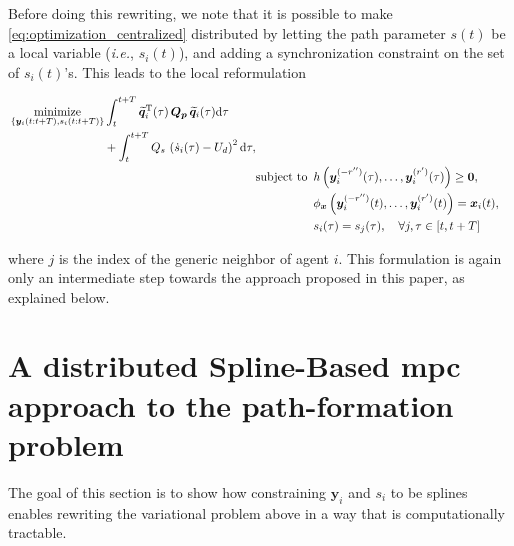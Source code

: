 Before doing this rewriting, we note that it is possible to make \eqref{eq:optimization_centralized} distributed by letting the path parameter $s(t)$ be a local variable (\emph{i.e.}, $s_i(t)$), and adding a synchronization constraint on the set of $s_i(t)$'s. This leads to the local reformulation

\begin{subequations}
    \begin{align}
        \begin{split}
            &\opt_{ \left\lbrace \bm{y}_i(t:t+T), s_i(t:t+T) \right\rbrace }
            \int_{t}^{t+T}
                \widetilde{\bm{q}}_i\T(\tau)
                \, \bm{Q}_{\bm{p}} \, 
                \widetilde{\bm{q}}_i(\tau)
                {\rm d}\tau \\
            & \qquad \qquad \qquad \qquad
            + \int_{t}^{t+T} Q_s \,\left(\dot{s}_i(\tau) - U_d\right)^2 {\rm d}\tau , 
        \end{split} \label{eq:criterion}\\
        & \text{subject to } \, h\left(\bm{y}_i^{(-r'')}(\tau), \ldots, \bm{y}^{(r')}_i(\tau)\right) \geq \bm{0}, \label{eq:constraint_h} \\
        & \phantom{\text{subject to } \,} \phi_{\bm{x}} \left(\bm{y}_i^{(-r'')}(t), \ldots, \bm{y}^{(r')}_i(t)\right) = \bm{x}_{i}(t), \label{eq:constraint_x0} \\
        & \phantom{\text{subject to } \,} s_i(\tau) = s_j(\tau), \quad \forall j, \tau \in [t, t+T] \label{eq:constraint_gamma_s}
    \end{align}
\label{eq:optimization_distributed}

\end{subequations}

\noindent where $j$ is the index of the generic neighbor of agent $i$. This formulation is again only an intermediate step towards the approach proposed in this paper, as explained below. 



\section{A distributed Spline-Based \gls{mpc} approach to the path-formation problem}
\label{sec:spline-based-MPC}



The goal of this section is to show how constraining $\bm{y}_i$ and $s_i$ to be splines enables rewriting the variational problem above in a way that is computationally tractable.

